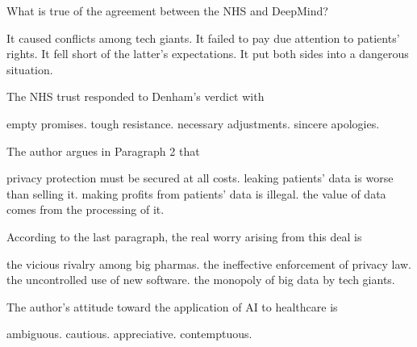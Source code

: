 \item What is true of the agreement between the NHS and DeepMind?
\begin{tasks}
	\task It caused conflicts among tech giants.
	\task It failed to pay due attention to patients' rights.
	\task It fell short of the latter's expectations.
	\task It put both sides into a dangerous situation.
\end{tasks}
\item The NHS trust responded to Denham's verdict with
\begin{tasks}
	\task empty promises.
	\task tough resistance.
	\task necessary adjustments.
	\task sincere apologies.
\end{tasks}
\item The author argues in Paragraph 2 that
\begin{tasks}
	\task privacy protection must be secured at all costs.
	\task leaking patients' data is worse than selling it.
	\task making profits from patients' data is illegal.
	\task the value of data comes from the processing of it.
\end{tasks}
\item According to the last paragraph, the real worry arising from this deal is
\begin{tasks}
	\task the vicious rivalry among big pharmas.
	\task the ineffective enforcement of privacy law.
	\task the uncontrolled use of new software.
	\task the monopoly of big data by tech giants.
\end{tasks}
\item The author's attitude toward the application of AI to healthcare is
\begin{tasks}
	\task ambiguous.
	\task cautious.
	\task appreciative.
	\task contemptuous.
\end{tasks}